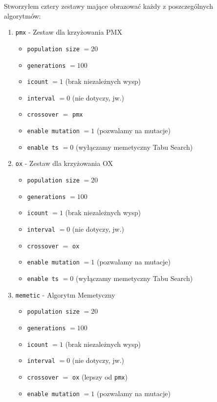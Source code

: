 Stworzyłem cztery zestawy mające obrazować każdy z poszczególnych algorytmów:
\begin{enumerate}
    \item \texttt{pmx} - Zestaw dla krzyżowania PMX 
    \begin{itemize}
        \item \texttt{population size} $= 20$
        \item \texttt{generations} $= 100$
        \item \texttt{icount} $= 1$ (brak niezależnych wysp)
        \item \texttt{interval} $= 0$ (nie dotyczy, jw.)
        \item \texttt{crossover} $=$ \texttt{pmx}
        \item \texttt{enable mutation} $= 1$ (pozwalamy na mutacje)
        \item \texttt{enable ts} $= 0$ (wyłączamy memetyczny Tabu Search)
    \end{itemize}
    \item \texttt{ox} - Zestaw dla krzyżowania OX
    \begin{itemize}
        \item \texttt{population size} $= 20$
        \item \texttt{generations} $= 100$
        \item \texttt{icount} $= 1$ (brak niezależnych wysp)
        \item \texttt{interval} $= 0$ (nie dotyczy, jw.)
        \item \texttt{crossover} $=$ \texttt{ox}
        \item \texttt{enable mutation} $= 1$ (pozwalamy na mutacje)
        \item \texttt{enable ts} $= 0$ (wyłączamy memetyczny Tabu Search)
    \end{itemize}
    \item \texttt{memetic} - Algorytm Memetyczny
    \begin{itemize}
        \item \texttt{population size} $= 20$
        \item \texttt{generations} $= 100$
        \item \texttt{icount} $= 1$ (brak niezależnych wysp)
        \item \texttt{interval} $= 0$ (nie dotyczy, jw.)
        \item \texttt{crossover} $=$ \texttt{ox} (lepszy od \texttt{pmx})
        \item \texttt{enable mutation} $= 1$ (pozwalamy na mutacje)

\end{itemize}
\end{enumerate}
